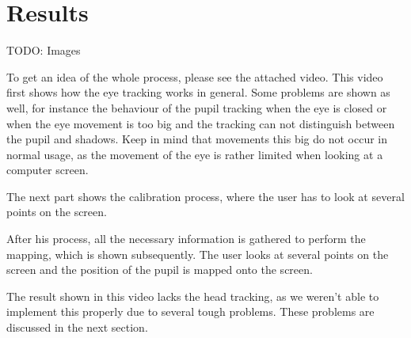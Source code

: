 \section{Results}\label{results}

TODO: Images

To get an idea of the whole process, please see the attached video. This video first shows how the eye tracking works in general. Some problems are shown as well, for instance the behaviour of the pupil tracking when the eye is closed or when the eye movement is too big and the tracking can not distinguish between the pupil and shadows. Keep in mind that movements this big do not occur in normal usage, as the movement of the eye is rather limited when looking at a computer screen.

The next part shows the calibration process, where the user has to look at several points on the screen.

After his process, all the necessary information is gathered to perform the mapping, which is shown subsequently. The user looks at several points on the screen and the position of the pupil is mapped onto the screen. 

The result shown in this video lacks the head tracking, as we weren't able to implement this properly due to several tough problems. These problems are discussed in the next section.


